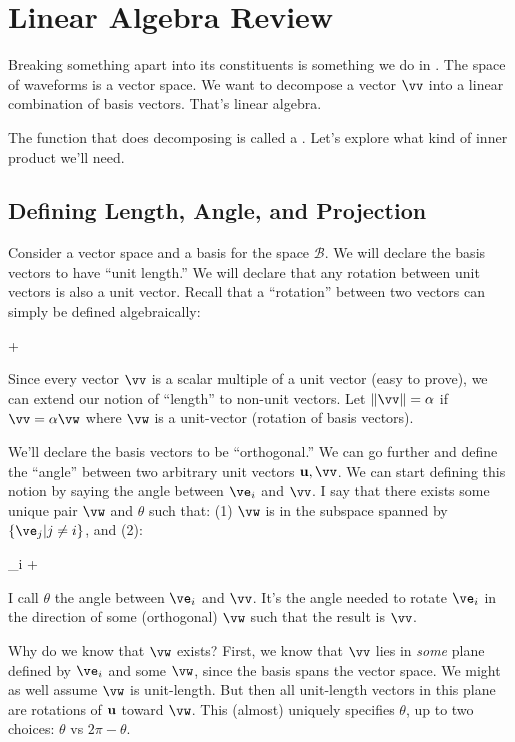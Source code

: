 \section{Linear Algebra Review}

Breaking something apart into its constituents is something we do in
. The space of waveforms is a vector space. We
want to decompose a vector $\vv$ into a linear combination of basis
vectors. That's linear algebra.

The function that does decomposing is called a .
Let's explore what kind of inner product we'll need.

\subsection{Defining Length, Angle, and Projection}

Consider a vector space and a basis for the space $\mathcal{B}$. We will
declare the basis vectors to have ``unit length.'' We will declare that
any rotation between unit vectors is also a unit vector. Recall that a
``rotation'' between two vectors can simply be defined algebraically:

\begin{nedqn}
  \cos\theta \vu + \sin\theta \vv
\end{nedqn}

Since every vector $\vv$ is a scalar multiple of a unit vector (easy to
prove), we can extend our notion of ``length'' to non-unit vectors. Let
$\norm{\vv} = \alpha$ if $\vv = \alpha \vw$ where $\vw$ is a unit-vector
(rotation of basis vectors).

We'll declare the basis vectors to be ``orthogonal.'' We can go further
and define the ``angle'' between two arbitrary unit vectors $\vu, \vv$.
We can start defining this notion by saying the angle between $\ve_i$
and $\vv$. I say that there exists some unique pair $\vw$ and $\theta$
such that: (1) $\vw$ is in the subspace spanned by $\setof{\ve_j | j \ne
i}$, and (2):

\begin{nedqn}
  \vv
\eqcol
  \cos\theta \ve_i + \sin\theta \vw
\end{nedqn}

\noindent
I call $\theta$ the angle between $\ve_i$ and $\vv$. It's the angle
needed to rotate $\ve_i$ in the direction of some (orthogonal) $\vw$
such that the result is $\vv$.

Why do we know that $\vw$ exists? First, we know that $\vv$ lies in
\emph{some} plane defined by $\ve_i$ and some $\vw$, since the basis
spans the vector space. We might as well assume $\vw$ is unit-length.
But then all unit-length vectors in this plane are rotations of $\bm{\mathrm{u}}$
toward $\vw$. This (almost) uniquely specifies $\theta$, up to two
choices: $\theta$ vs $2\pi - \theta$.

